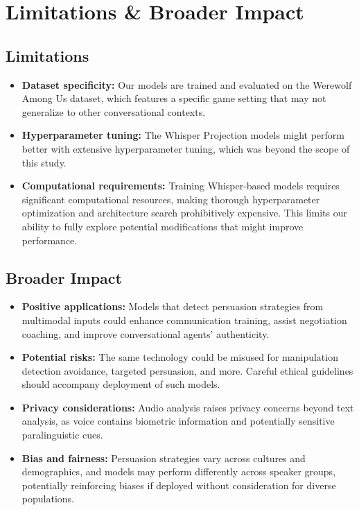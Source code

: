 \documentclass{article}
\begin{document}
\section{Limitations \& Broader Impact}
\subsection{Limitations}
\begin{itemize}
    \item \textbf{Dataset specificity:} Our models are trained and evaluated on the Werewolf Among Us dataset, which features a specific game setting that may not generalize to other conversational contexts.
    
    \item \textbf{Hyperparameter tuning:} The Whisper Projection models might perform better with extensive hyperparameter tuning, which was beyond the scope of this study.
    
    \item \textbf{Computational requirements:} Training Whisper-based models requires significant computational resources, making thorough hyperparameter optimization and architecture search prohibitively expensive. This limits our ability to fully explore potential modifications that might improve performance.
\end{itemize}

\subsection{Broader Impact}
\begin{itemize}
    \item \textbf{Positive applications:} Models that detect persuasion strategies from multimodal inputs could enhance communication training, assist negotiation coaching, and improve conversational agents' authenticity.
    
    \item \textbf{Potential risks:} The same technology could be misused for manipulation detection avoidance, targeted persuasion, and more. Careful ethical guidelines should accompany deployment of such models.
    
    \item \textbf{Privacy considerations:} Audio analysis raises privacy concerns beyond text analysis, as voice contains biometric information and potentially sensitive paralinguistic cues.
    
    \item \textbf{Bias and fairness:} Persuasion strategies vary across cultures and demographics, and models may perform differently across speaker groups, potentially reinforcing biases if deployed without consideration for diverse populations.
\end{itemize}
\end{document}
